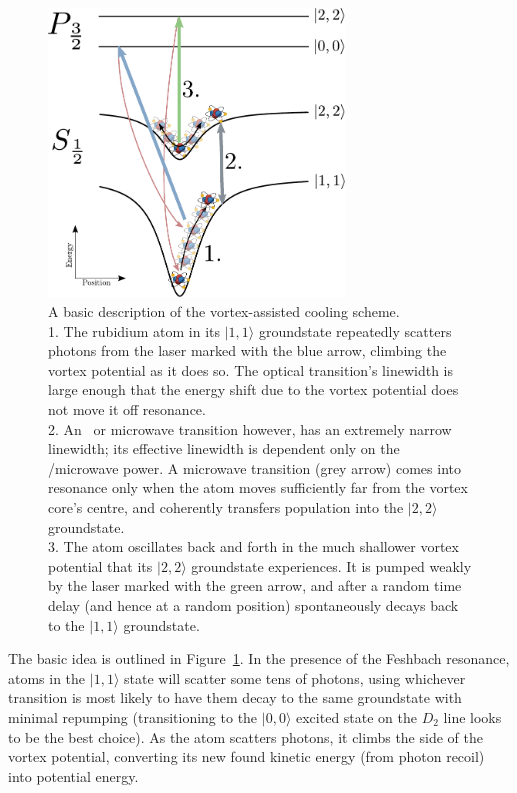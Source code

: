 \begin{figure}
\begin{center}
\includegraphics[width=0.7\textwidth]{figures/unsorted/vortexcooling.pdf}
\caption{A basic description of the vortex-assisted cooling scheme.
\protect\\
1. The rubidium atom in its $|1,1\rangle$ groundstate repeatedly scatters photons from the laser marked with the blue arrow, climbing the vortex potential as it does so. The optical transition's linewidth is large enough that the energy shift due to the vortex potential does not move it off resonance.
\protect\\
 2. An \rf\ or microwave transition however, has an extremely narrow linewidth; its effective linewidth is dependent only on the \rf/microwave power. A microwave transition (grey arrow) comes into resonance only when the atom moves sufficiently far from the vortex core's centre, and coherently transfers population into the $|2,2\rangle$ groundstate.
 \protect\\
 3. The atom oscillates back and forth in the much shallower vortex potential that its $|2,2\rangle$ groundstate experiences. It is pumped weakly by the laser marked with the green arrow, and after a random time delay (and hence at a random position) spontaneously decays back to the $|1,1\rangle$ groundstate.
}\label{fig:vortexcooling}
\end{center}
\end{figure}

The basic idea is outlined in Figure~\ref{fig:vortexcooling}. In the presence of the Feshbach resonance, atoms in the $|1,1\rangle$ state will scatter some tens of photons, using whichever transition is most likely to have them decay to the same groundstate with minimal repumping (transitioning to the $|0,0\rangle$ excited state on the $D_2$ line looks to be the best choice). As the atom scatters photons, it climbs the side of the vortex potential, converting its new found kinetic energy (from photon recoil) into potential energy.

